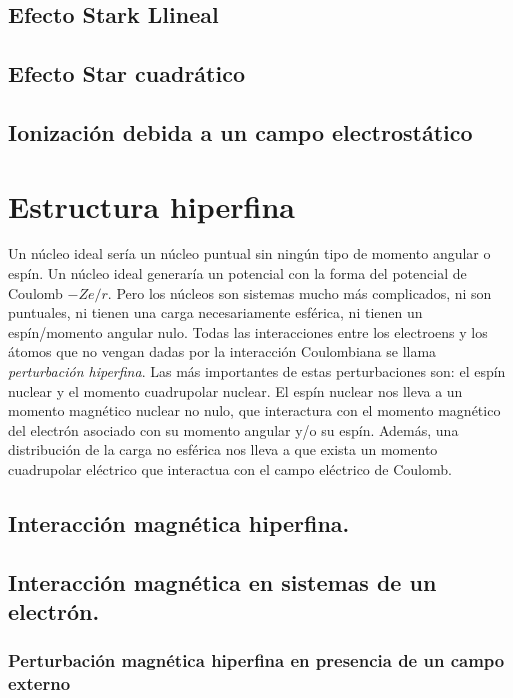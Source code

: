 \subsection{Efecto Stark Llineal}

\subsection{Efecto Star cuadrático}

\subsection{Ionización debida a un campo electrostático}

\section{Estructura hiperfina}

Un núcleo ideal sería un núcleo puntual sin ningún tipo de momento angular o espín. Un núcleo ideal generaría un potencial con la forma del potencial de Coulomb $-Ze/r$. Pero los núcleos son sistemas mucho más complicados, ni son puntuales, ni tienen una carga necesariamente esférica, ni tienen un espín/momento angular nulo. Todas las interacciones entre los electroens y los átomos que no vengan dadas por la interacción Coulombiana se llama \textit{perturbación hiperfina}. Las más importantes de estas perturbaciones son: el espín nuclear y el momento cuadrupolar nuclear. El espín nuclear nos lleva a un momento magnético nuclear no nulo, que interactura con el momento magnético del electrón asociado con su momento angular y/o su espín. Además, una distribución de la carga no esférica nos lleva a que exista un momento cuadrupolar eléctrico que interactua con el campo eléctrico de Coulomb.

\subsection{Interacción magnética hiperfina.}

\subsection{Interacción magnética en sistemas de un electrón.}

\subsubsection{Perturbación magnética hiperfina en presencia de un campo externo}

